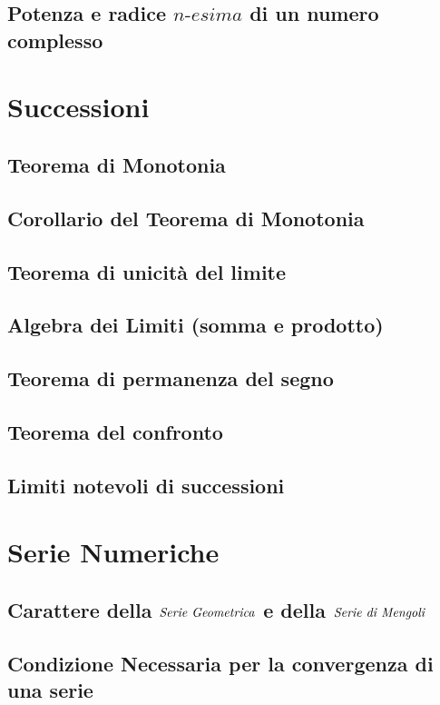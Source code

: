 \documentclass[11pt, a4paper]{book}
\begin{document}
\section{Potenza e radice $\textit{n-esima}$ di un numero complesso}





\chapter{Successioni}
\section{Teorema di Monotonia}
\section{Corollario del Teorema di Monotonia}
\section{Teorema di unicità del limite}
\section{Algebra dei Limiti (somma e prodotto)}
\section{Teorema di permanenza del segno}
\section{Teorema del confronto}
\section{Limiti notevoli di successioni}

\chapter{Serie Numeriche}
\section{Carattere della $\emph{Serie Geometrica}$ e della $\emph{Serie di Mengoli}$}
\section{Condizione Necessaria per la convergenza di una serie}
\end{document}
